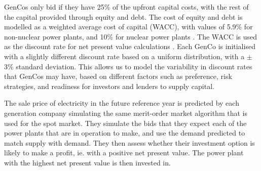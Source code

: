 GenCos only bid if they have 25\% of the upfront capital costs, with the rest of the capital provided through equity and debt. The cost of equity and debt is modelled as a weighted average cost of capital (WACC), with values of 5.9\% for non-nuclear power plants, and 10\% for nuclear power plants \cite{KPMG2017, Paper2012}. The WACC is used as the discount rate for net present value calculations \cite{KincheloeStephenC1990TWAC}. Each GenCo is initialised with a slightly different discount rate based on a uniform distribution, with a $\pm$3\% standard deviation. This allows us to model the variability in discount rates that GenCos may have, based on different factors such as preference, risk strategies, and readiness for investors and lenders to supply capital.

The sale price of electricity in the future reference year is predicted by each generation company simulating the same merit-order market algorithm that is used for the spot market. They simulate the bids that they expect each of the power plants that are in operation to make, and use the demand predicted to match supply with demand. They then assess whether their investment option is likely to make a profit, ie. with a positive net present value. The power plant with the highest net present value is then invested in. 




